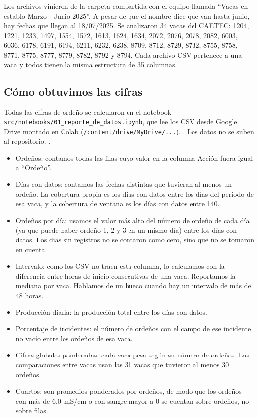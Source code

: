 \documentclass[11pt,letterpaper,DIV=12]{scrartcl}
\begin{document}
Los archivos vinieron de la carpeta compartida con el equipo llamada ``Vacas en establo Marzo - Junio 2025''. A pesar de que el nombre dice que van hasta junio, hay fechas que llegan al 18/07/2025. Se analizaron 34 vacas del CAETEC: 1204, 1221, 1233, 1497, 1554, 1572, 1613, 1624, 1634, 2072, 2076, 2078, 2082, 6003, 6036, 6178, 6191, 6194, 6211, 6232, 6238, 8709, 8712, 8729, 8732, 8755, 8758, 8771, 8775, 8777, 8779, 8782, 8792 y 8794. Cada archivo CSV pertenece a una vaca y todos tienen la misma estructura de 35 columnas.

\subsection{Cómo obtuvimos las cifras}

Todas las cifras de ordeño se calcularon en el notebook \texttt{src/notebooks/01\_reporte\_de\_datos.ipynb}, que lee los CSV desde Google Drive montado en Colab (\texttt{/content/drive/MyDrive/...}). . Los datos no se suben al repositorio. .

\begin{itemize}
  \item Ordeños: contamos todas las filas cuyo valor en la columna Acción fuera igual a ``Ordeño''.
  \item Días con datos: contamos las fechas distintas que tuvieran al menos un ordeño. La cobertura propia es los días con datos entre los días del periodo de esa vaca, y la cobertura de ventana es los días con datos entre 140.
  \item Ordeños por día: usamos el valor más alto del número de ordeño de cada día (ya que puede haber ordeño 1, 2 y 3 en un mismo día) entre los días con datos. Los días sin registros no se contaron como cero, sino que no se tomaron en cuenta.
  \item Intervalo: como los CSV no traen esta columna, lo calculamos con la diferencia entre horas de inicio consecutivas de una vaca. Reportamos la mediana por vaca. Hablamos de un hueco cuando hay un intervalo de más de 48 horas.
  \item Producción diaria: la producción total entre los días con datos.
  \item Porcentaje de incidentes: el número de ordeños con el campo de ese incidente no vacío entre los ordeños de esa vaca.
  \item Cifras globales ponderadas: cada vaca pesa según su número de ordeños. Las comparaciones entre vacas usan las 31 vacas que tuvieron al menos 30 ordeños.
  \item Cuartos: son promedios ponderados por ordeños, de modo que los ordeños con más de 6.0~mS/cm o con sangre mayor a 0 se cuentan sobre ordeños, no sobre filas.
\end{itemize}
\end{document}
